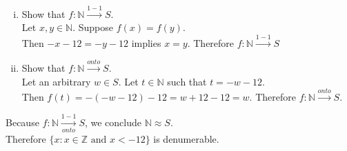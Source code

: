 \documentclass[a4paper,11pt]{article}
\begin{document}
    \begin{enumerate}[(i)]
      \item Show that \(f:\mathbb{N} \xrightarrow{1-1} S\).\\
      Let \(x,y \in \mathbb{N}\). Suppose \(f{(x)}=f{(y)}\).\\
      Then \(-x - 12 = -y - 12\) implies \(x = y\). Therefore \(f:\mathbb{N} \xrightarrow{1-1} S\)
      \item Show that \(f:\mathbb{N} \xrightarrow{onto} S\).\\
     Let an arbitrary \(w \in S\). Let \(t \in \mathbb{N}\) such that \(t = -w - 12\).\\
     Then \(f{(t)} = -{(-w - 12)} - 12 = w + 12 - 12 = w\). Therefore \(f:\mathbb{N} \xrightarrow{onto} S\).
    \end{enumerate}
    Because \(f: \mathbb{N} \xrightarrow[onto]{1-1} S\), we conclude \(\mathbb{N} \approx S\).\\
    Therefore \(\{x:x \in \mathbb{Z} \text{ and } x < -12\}\) is 
    denumerable.\\
\newpage
\setcounter{ProblemCounter}{5}
\end{document}

